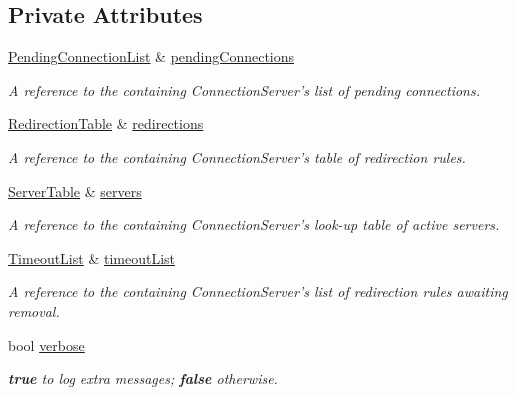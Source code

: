 \subsection*{\-Private \-Attributes}
\begin{DoxyCompactItemize}
\item 
\hyperlink{classNERD_1_1ConnectionServer_ac838d247f33cef856ae722343a8cb7ff}{\-Pending\-Connection\-List} \& \hyperlink{classNERD_1_1ConnectionServer_1_1ServerExitHandler_a0953476221ba91597772e457b7357eae}{pending\-Connections}
\begin{DoxyCompactList}\small\item\em \-A reference to the containing \-Connection\-Server's list of pending connections. \end{DoxyCompactList}\item 
\hyperlink{classNERD_1_1ConnectionServer_a1f7b6abdda0f0a7a027a5f2e24727cee}{\-Redirection\-Table} \& \hyperlink{classNERD_1_1ConnectionServer_1_1ServerExitHandler_af4572dea480ca71da58a92ce88b8153e}{redirections}
\begin{DoxyCompactList}\small\item\em \-A reference to the containing \-Connection\-Server's table of redirection rules. \end{DoxyCompactList}\item 
\hyperlink{classNERD_1_1ConnectionServer_a0cd661f2a6755c501ac198229675ad4d}{\-Server\-Table} \& \hyperlink{classNERD_1_1ConnectionServer_1_1ServerExitHandler_a9155fa7acc10d3e954d5998624c80bd7}{servers}
\begin{DoxyCompactList}\small\item\em \-A reference to the containing \-Connection\-Server's look-\/up table of active servers. \end{DoxyCompactList}\item 
\hyperlink{classNERD_1_1ConnectionServer_a63d211040487b4566f2f696026723932}{\-Timeout\-List} \& \hyperlink{classNERD_1_1ConnectionServer_1_1ServerExitHandler_ac95b8019ae4312f278e28808e92b77a1}{timeout\-List}
\begin{DoxyCompactList}\small\item\em \-A reference to the containing \-Connection\-Server's list of redirection rules awaiting removal. \end{DoxyCompactList}\item 
bool \hyperlink{classNERD_1_1ConnectionServer_1_1ServerExitHandler_ac25e75d9b69963b6c0624099b8d6ec15}{verbose}
\begin{DoxyCompactList}\small\item\em {\bfseries true} to log extra messages; {\bfseries false} otherwise. \end{DoxyCompactList}\end{DoxyCompactItemize}


